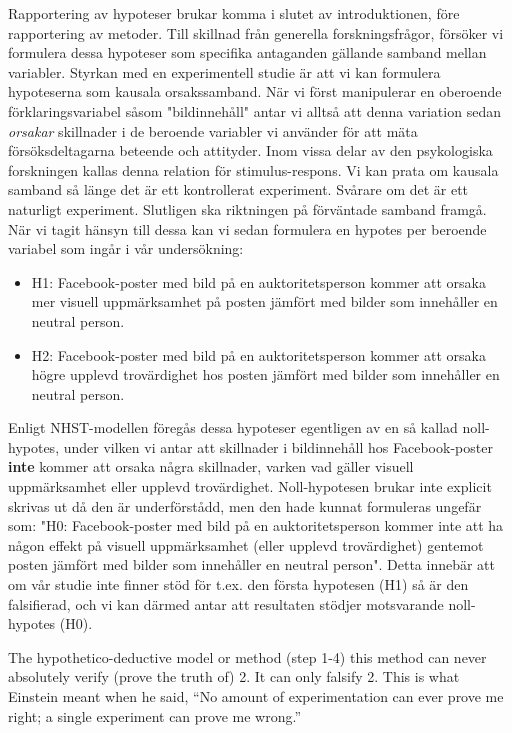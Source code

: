 \documentclass[
]{book}
\begin{document}
Rapportering av hypoteser brukar komma i slutet av introduktionen, före rapportering av metoder. Till skillnad från generella forskningsfrågor, försöker vi formulera dessa hypoteser som specifika antaganden gällande samband mellan variabler. Styrkan med en experimentell studie är att vi kan formulera hypoteserna som kausala orsakssamband. När vi först manipulerar en oberoende förklaringsvariabel såsom "bildinnehåll" antar vi alltså att denna variation sedan \emph{orsakar} skillnader i de beroende variabler vi använder för att mäta försöksdeltagarna beteende och attityder. Inom vissa delar av den psykologiska forskningen kallas denna relation för stimulus-respons. Vi kan prata om kausala samband så länge det är ett kontrollerat experiment. Svårare om det är ett naturligt experiment. Slutligen ska riktningen på förväntade samband framgå. När vi tagit hänsyn till dessa kan vi sedan formulera en hypotes per beroende variabel som ingår i vår undersökning:

\begin{itemize}
\item
  H1: Facebook-poster med bild på en auktoritetsperson kommer att orsaka mer visuell uppmärksamhet på posten jämfört med bilder som innehåller en neutral person.
\item
  H2: Facebook-poster med bild på en auktoritetsperson kommer att orsaka högre upplevd trovärdighet hos posten jämfört med bilder som innehåller en neutral person.
\end{itemize}

Enligt NHST-modellen föregås dessa hypoteser egentligen av en så kallad noll-hypotes, under vilken vi antar att skillnader i bildinnehåll hos Facebook-poster \textbf{inte} kommer att orsaka några skillnader, varken vad gäller visuell uppmärksamhet eller upplevd trovärdighet. Noll-hypotesen brukar inte explicit skrivas ut då den är underförstådd, men den hade kunnat formuleras ungefär som: "H0: Facebook-poster med bild på en auktoritetsperson kommer inte att ha någon effekt på visuell uppmärksamhet (eller upplevd trovärdighet) gentemot posten jämfört med bilder som innehåller en neutral person". Detta innebär att om vår studie inte finner stöd för t.ex. den första hypotesen (H1) så är den falsifierad, och vi kan därmed antar att resultaten stödjer motsvarande noll-hypotes (H0).

The hypothetico-deductive model or method (step 1-4) this method can never absolutely verify (prove the truth of) 2. It can only falsify 2. This is what Einstein meant when he said, ``No amount of experimentation can ever prove me right; a single experiment can prove me wrong.'' \citep{einstein2002induction}
\end{document}
